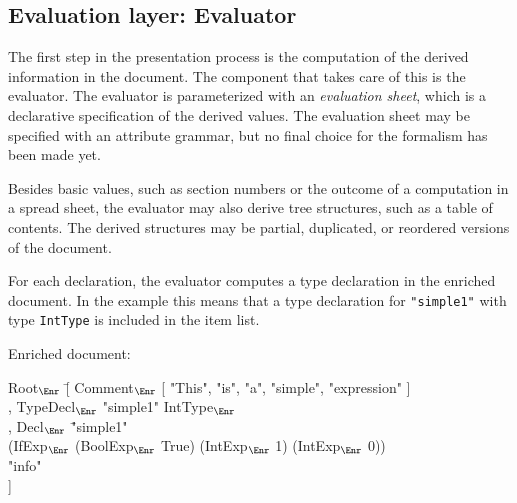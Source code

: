 \begin{center}
\end{center}

%																
\subsection{Evaluation layer: Evaluator} \label{sect:evaluator}

The first step in the presentation process is the computation of the derived information in the document. The component that takes care of this is the evaluator. The evaluator is parameterized with an {\em evaluation sheet}, which is a declarative specification of the derived values. The evaluation sheet may be specified with an attribute grammar, but no final choice for the formalism has been made yet.

Besides basic values, such as section numbers or the outcome of a computation in a spread sheet, the evaluator may also derive tree structures, such as a table of contents. The derived structures may be partial, duplicated, or reordered versions of the document.

 For each declaration, the evaluator computes a type declaration in the enriched document. In the example this means that a type declaration for \verb|"simple1"| with type {\tt IntType} is included in the item list.

Enriched document:
\small \ttfamily
\begin{tabbing}
Root$_{\Enr}$ \= [ Comment$_{\Enr}$ [ "This", "is", "a", "simple", "expression" ]\\
       \> , TypeDecl$_{\Enr}$ "simple1" IntType$_{\Enr}$\\
       \> , Decl$_{\Enr}$ \= "simple1"\\
       \>                       \> (IfExp$_{\Enr}$ (BoolExp$_{\Enr}$ True) (IntExp$_{\Enr}$ 1) (IntExp$_{\Enr}$ 0)) \\
       \>                        \> "info"\\
       \> ] 
\end{tabbing}
\rmfamily \normalsize


